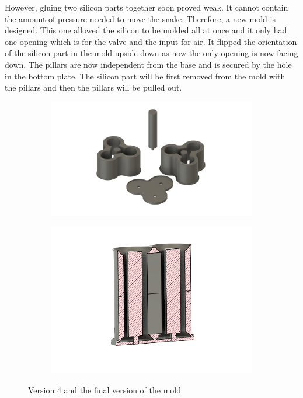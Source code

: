 \documentclass[twoside]{article}
\begin{document}
However, gluing two silicon parts together soon proved weak. It cannot contain the amount of pressure needed to move the snake. Therefore, a new mold is designed. This one allowed the silicon to be molded all at once and it only had one opening which is for the valve and the input for air. It flipped the orientation of the silicon part in the mold upside-down as now the only opening is now facing down. The pillars are now independent from the base and is secured by the hole in the bottom plate. The silicon part will be first removed from the mold with the pillars and then the pillars will be pulled out.

\begin{figure} [H]
\centering
\begin{subfigure}[b]{0.5\linewidth}
		\centering
		\includegraphics[width=\textwidth]{mold_v4}
	\end{subfigure}%
	\begin{subfigure}[b]{0.5\linewidth}
		\centering		
		\includegraphics[width=\textwidth]{assembled_v4}
	\end{subfigure}
\caption{Version 4 and the final version of the mold}
\end{figure}
\end{document}
